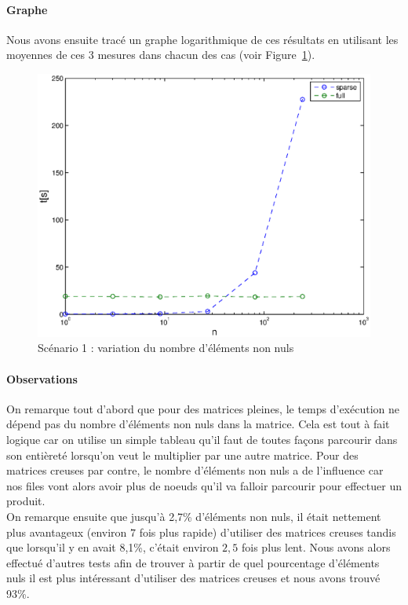 \documentclass[12pt,a4paper]{article}
\begin{document}
\paragraph{Graphe}
Nous avons ensuite tracé un graphe logarithmique de ces résultats en utilisant les moyennes de ces 3 mesures dans chacun des cas (voir Figure~\ref{vnz}).
\begin{figure}[!h]
	\begin{center}
		\includegraphics[width=15cm]{taillecst.eps}
		\caption{Scénario 1 : variation du nombre d'éléments non nuls}
		\label{vnz}
	\end{center}
\end{figure}

\paragraph{Observations}

On remarque tout d'abord que pour des matrices pleines, le temps d'exécution ne dépend pas du nombre d'éléments non nuls dans la matrice. Cela est tout à fait logique car on utilise un simple tableau qu'il faut de toutes façons parcourir dans son entièreté lorsqu'on veut le multiplier par une autre matrice. Pour des matrices creuses par contre, le nombre d'éléments non nuls a de l'influence car nos files vont alors avoir plus de noeuds qu'il va falloir parcourir pour effectuer un produit.\\

On remarque ensuite que jusqu'à 2,7\% d'éléments non nuls, il était nettement plus avantageux (environ $7$ fois plus rapide) d'utiliser des matrices creuses tandis que lorsqu'il y en avait 8,1\%, c'était environ $2,5$ fois plus lent. Nous avons alors effectué d'autres tests afin de trouver à partir de quel pourcentage d'éléments nuls il est plus intéressant d'utiliser des matrices creuses et nous avons trouvé 93\%.
\end{document}
